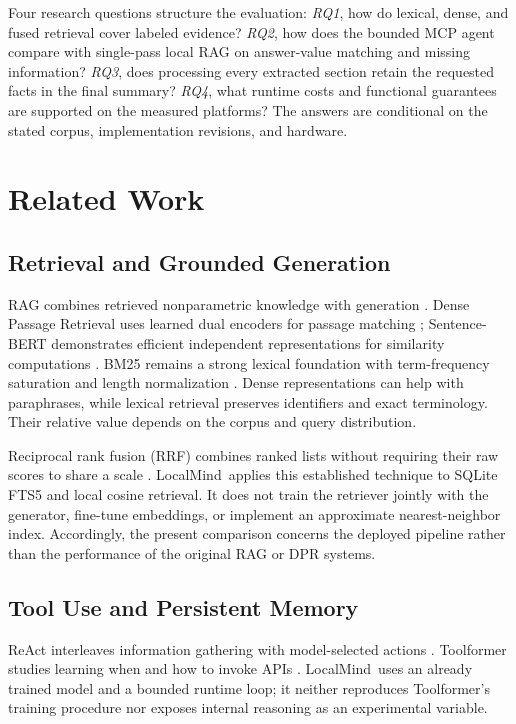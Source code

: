 \documentclass[conference,letterpaper]{IEEEtran}
\newcommand{\method}{LocalMind}
\begin{document}
Four research questions structure the evaluation: \emph{RQ1}, how do lexical, dense, and fused retrieval cover labeled evidence? \emph{RQ2}, how does the bounded MCP agent compare with single-pass local RAG on answer-value matching and missing information? \emph{RQ3}, does processing every extracted section retain the requested facts in the final summary? \emph{RQ4}, what runtime costs and functional guarantees are supported on the measured platforms? The answers are conditional on the stated corpus, implementation revisions, and hardware.

\section{Related Work}
\subsection{Retrieval and Grounded Generation}
RAG combines retrieved nonparametric knowledge with generation \cite{rag}. Dense Passage Retrieval uses learned dual encoders for passage matching \cite{dpr}; Sentence-BERT demonstrates efficient independent representations for similarity computations \cite{sbert}. BM25 remains a strong lexical foundation with term-frequency saturation and length normalization \cite{bm25}. Dense representations can help with paraphrases, while lexical retrieval preserves identifiers and exact terminology. Their relative value depends on the corpus and query distribution.

Reciprocal rank fusion (RRF) combines ranked lists without requiring their raw scores to share a scale \cite{rrf}. \method\ applies this established technique to SQLite FTS5 and local cosine retrieval. It does not train the retriever jointly with the generator, fine-tune embeddings, or implement an approximate nearest-neighbor index. Accordingly, the present comparison concerns the deployed pipeline rather than the performance of the original RAG or DPR systems.

\subsection{Tool Use and Persistent Memory}
ReAct interleaves information gathering with model-selected actions \cite{react}. Toolformer studies learning when and how to invoke APIs \cite{toolformer}. \method\ uses an already trained model and a bounded runtime loop; it neither reproduces Toolformer's training procedure nor exposes internal reasoning as an experimental variable.
\end{document}
